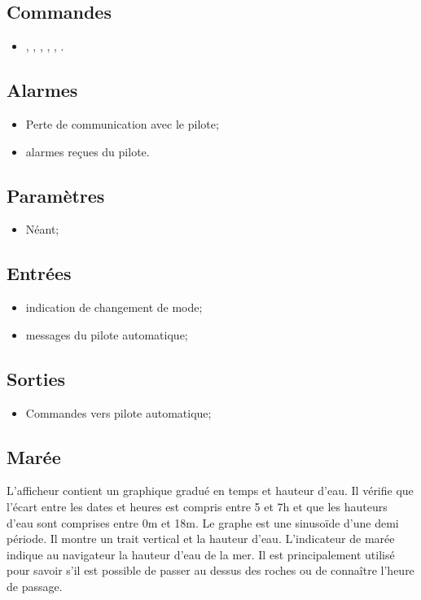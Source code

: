 \documentclass[a4paper,11pt]{report}
\begin{document}
\subsection{Commandes}
\begin{itemize}
	\item {}, , , ,
	, .
\end{itemize}

\subsection{Alarmes}
\begin{itemize}
	\item Perte de communication avec le pilote;
	\item alarmes reçues du pilote.
\end{itemize}

\subsection{Paramètres}
\begin{itemize}
	\item Néant;
\end{itemize}

\subsection{Entrées}
\begin{itemize}
	\item indication de changement de mode;
	\item messages du pilote automatique;
\end{itemize}

\subsection{Sorties}
\begin{itemize}
	\item Commandes vers pilote automatique;
\end{itemize}

\subsection{Marée}
L'afficheur contient un graphique gradué en temps et hauteur d'eau.
Il vérifie que l'écart entre les dates et heures est compris entre 5 et 7h
et que les hauteurs d'eau sont comprises entre 0m et 18m.
Le graphe est une sinusoïde d'une demi période.
Il montre un trait vertical et la hauteur d'eau.
L'indicateur de marée indique au navigateur la hauteur d'eau de la mer.
Il est principalement utilisé pour savoir s'il est possible de passer
au dessus des roches ou de connaître l'heure de passage.

\end{document}
